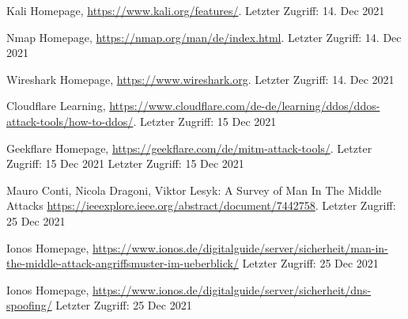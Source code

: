 \begin{thebibliography}{8}
Kali Homepage, \url{https://www.kali.org/features/}. Letzter Zugriff: 14. Dec 2021

Nmap Homepage, \url{https://nmap.org/man/de/index.html}. Letzter Zugriff: 14. Dec 2021

Wireshark Homepage, \url{https://www.wireshark.org}. Letzter Zugriff: 14. Dec 2021

Cloudflare Learning, \url{ https://www.cloudflare.com/de-de/learning/ddos/ddos-attack-tools/how-to-ddos/}. Letzter Zugriff: 15 Dec 2021

Geekflare Homepage, \url{https://geekflare.com/de/mitm-attack-tools/}. Letzter Zugriff: 15 Dec 2021 Letzter Zugriff: 15 Dec 2021

Mauro Conti, Nicola Dragoni, Viktor Lesyk: A Survey of Man In The Middle Attacks \url{https://ieeexplore.ieee.org/abstract/document/7442758}. Letzter Zugriff: 25 Dec 2021

Ionos Homepage, \url{https://www.ionos.de/digitalguide/server/sicherheit/man-in-the-middle-attack-angriffsmuster-im-ueberblick/} Letzter Zugriff: 25 Dec 2021

Ionos Homepage, \url{https://www.ionos.de/digitalguide/server/sicherheit/dns-spoofing/} Letzter Zugriff: 25 Dec 2021







\end{thebibliography}